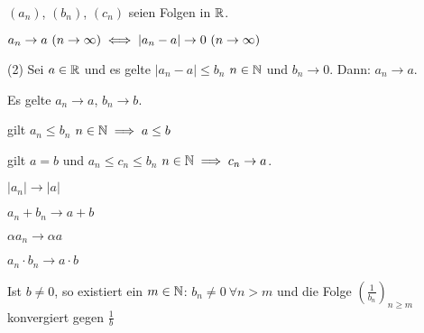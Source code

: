\documentclass[a4paper,twoside,DIV15,BCOR12mm]{scrbook}
\begin{document}
\begin{satz}[Konvergenzsätze]
$(a_n)$, $(b_n)$, $(c_n)$ seien Folgen in $\mathbb{R}$.
\begin{liste}
\item $a_n \to a \ (n \to \infty) \iff |a_n - a| \to 0 \ (n \to \infty)$
\item[(2)] Sei $a \in \mathbb{R}$ und es gelte $|a_n - a| \le b_n$ \ffa $n\in\mathbb{N}$ und $b_n \to 0$. Dann: $a_n \to a$.
\item Es gelte $a_n \to a$, $b_n \to b$.
\begin{liste}
\item gilt $a_n \le b_n$ \ffa $n\in\mathbb{N} \implies a \le b$
\item gilt $a=b$ und $a_n \le c_n \le b_n$ \ffa $n\in\mathbb{N} \implies c_n \to a$.
\item $|a_n| \to |a|$
\item $a_n + b_n \to a+b$
\item $\alpha a_n \to \alpha a$
\item $a_n \cdot b_n \to a\cdot b$
\item Ist $b \ne 0$, so existiert ein $m\in\mathbb{N}$: $b_n \ne 0\ \forall n >m$ und die Folge $(\frac{1}{b_n})_{n\ge m}$ konvergiert gegen $\frac{1}{b}$
\end{liste}
\end{liste}
\end{satz}
\end{document}
